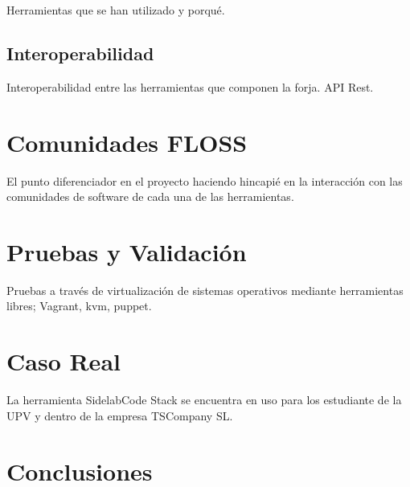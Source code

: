 \documentclass[11pt]{scrartcl}
\begin{document}
\par Herramientas que se han utilizado y porqu\'e.


\subsection{Interoperabilidad}
\label{sub:interoperabilidad}

\par Interoperabilidad entre las herramientas que componen la forja. API Rest.



\section{Comunidades FLOSS}
\label{sec:comunidades}

\par El punto diferenciador en el proyecto haciendo hincapi\'e en la interacci\'on con las comunidades de software de cada una de las herramientas.


\section{Pruebas y Validaci\'on}
\label{sec:pruebas}

\par Pruebas a través de virtualizaci\'on de sistemas operativos mediante herramientas libres; Vagrant, kvm, puppet.


\section{Caso Real}
\label{sec:casoreal}

\par La herramienta SidelabCode Stack se encuentra en uso para los estudiante de la UPV y dentro de la empresa TSCompany SL.


\section{Conclusiones}
\label{sec:conclusiones}
\end{document}
